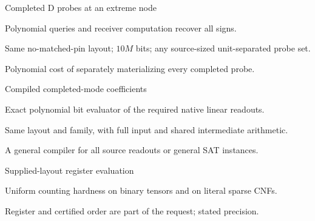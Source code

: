 \documentclass[11pt,a4paper]{article}
\newlength{\OfflineResearchTableWidth}
\newcommand{\OfflineResearchRow}{\par}
\newenvironment{OfflineResearchTable}{%
  \par\medskip\begingroup\small\setlength{\parindent}{0pt}%
  \setlength{\parskip}{3pt plus 1pt minus .5pt}%
  \setlength{\OfflineResearchTableWidth}{\linewidth}%
}{%
  \par\endgroup\medskip%
}
\begin{document}
\begin{OfflineResearchTable}
\begin{minipage}[t]{0.30240\OfflineResearchTableWidth}
\end{minipage}%
\OfflineResearchRow
\noindent%
\begin{minipage}[t]{0.17955\OfflineResearchTableWidth}\raggedright
Completed D probes at an extreme node
\end{minipage}\hfill%
\begin{minipage}[t]{0.22680\OfflineResearchTableWidth}\raggedright
Polynomial queries and receiver
computation recover all signs.
\end{minipage}\hfill%
\begin{minipage}[t]{0.23625\OfflineResearchTableWidth}\raggedright
Same no-matched-pin layout; \(10M\)
bits; any source-sized unit-separated probe set.
\end{minipage}\hfill%
\begin{minipage}[t]{0.30240\OfflineResearchTableWidth}\raggedright
Polynomial cost of
separately materializing every completed probe.
\end{minipage}%
\OfflineResearchRow
\noindent%
\begin{minipage}[t]{0.17955\OfflineResearchTableWidth}\raggedright
Compiled completed-mode coefficients
\end{minipage}\hfill%
\begin{minipage}[t]{0.22680\OfflineResearchTableWidth}\raggedright
Exact polynomial bit evaluator of
the required native linear readouts.
\end{minipage}\hfill%
\begin{minipage}[t]{0.23625\OfflineResearchTableWidth}\raggedright
Same layout and family, with full
input and shared intermediate arithmetic.
\end{minipage}\hfill%
\begin{minipage}[t]{0.30240\OfflineResearchTableWidth}\raggedright
A general compiler for all
source readouts or general SAT instances.
\end{minipage}%
\OfflineResearchRow
\noindent%
\begin{minipage}[t]{0.17955\OfflineResearchTableWidth}\raggedright
Supplied-layout register evaluation
\end{minipage}\hfill%
\begin{minipage}[t]{0.22680\OfflineResearchTableWidth}\raggedright
Uniform counting hardness on
binary tensors and on literal sparse CNFs.
\end{minipage}\hfill%
\begin{minipage}[t]{0.23625\OfflineResearchTableWidth}\raggedright
Register and certified
order are part of the request; stated precision.

\end{minipage}
\end{OfflineResearchTable}
\end{document}
